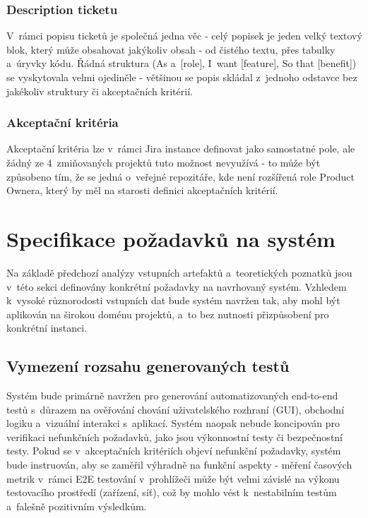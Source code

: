 \documentclass[czech, ing, kiv, he, iso690numb, viewonly]{fasthesis}
\begin{document}
\subsubsection*{Description ticketu}
V~rámci popisu ticketů je společná jedna věc - celý popisek je jeden velký textový blok, který může obsahovat jakýkoliv obsah - 
od čistého textu, přes tabulky a~úryvky kódu. Řádná struktura (As a~[role], I~want [feature], So that [benefit]) 
se vyskytovala velmi ojediněle - většinou se popis skládal z~jednoho odstavce bez jakékoliv struktury či akceptačních kritérií.


\subsubsection*{Akceptační kritéria}
Akceptační kritéria lze v~rámci Jira instance definovat jako samostatné pole, ale žádný ze 4~zmiňovaných projektů tuto možnost 
nevyužívá - to může být způsobeno tím, že se jedná o~veřejné repozitáře, kde není rozšířená role Product Ownera, který by měl na starosti definici 
akceptačních kritérií. 


\section{Specifikace požadavků na systém}
Na základě předchozí analýzy vstupních artefaktů a~teoretických poznatků jsou v~této sekci definovány konkrétní požadavky 
na navrhovaný systém. Vzhledem k~vysoké různorodosti vstupních dat bude systém navržen tak, aby mohl být aplikován na širokou 
doménu projektů, a~to bez nutnosti přizpůsobení pro konkrétní instanci.

\subsection{Vymezení rozsahu generovaných testů}
Systém bude primárně navržen pro generování automatizovaných end-to-end testů s~důrazem na ověřování chování uživatelského rozhraní (GUI),
obchodní logiku a~vizuální interakci s~aplikací. Systém naopak nebude koncipován pro verifikaci 
nefunkčních požadavků, jako jsou výkonnostní testy či bezpečnostní testy. Pokud se v~akceptačních kritériích objeví 
nefunkční požadavky, systém bude instruován, aby se zaměřil výhradně na funkční aspekty - měření časových metrik v~rámci E2E testování v~prohlížeči 
může být velmi závislé na výkonu testovacího prostředí (zařízení, síť), což by mohlo vést k~nestabilním testům a~falešně pozitivním výsledkům.
\end{document}
